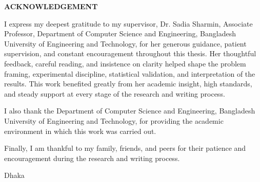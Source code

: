
\begin{center}
  \textbf{{\Large ACKNOWLEDGEMENT}}\\[60pt]
\end{center}

I express my deepest gratitude to my supervisor, Dr. Sadia Sharmin, Associate
Professor, Department of Computer Science and Engineering, Bangladesh University
of Engineering and Technology, for her generous guidance, patient supervision,
and constant encouragement throughout this thesis. Her thoughtful feedback,
careful reading, and insistence on clarity helped shape the problem framing,
experimental discipline, statistical validation, and interpretation of the
results. This work benefited greatly from her academic insight, high standards,
and steady support at every stage of the research and writing process.

I also thank the Department of Computer Science and Engineering, Bangladesh
University of Engineering and Technology, for providing the academic environment
in which this work was carried out.

Finally, I am thankful to my family, friends, and peers for their patience and
encouragement during the research and writing process.

\vspace*{20.0mm}

\begin{minipage}[t]{0.2\textwidth}
  Dhaka\par
  \thesisdate
\end{minipage}%
\hfill
\begin{minipage}[t]{0.45\textwidth}
  \begin{enumerate}
    \vspace{-0.75\baselineskip}
  \end{enumerate}
\end{minipage}

\endinput
